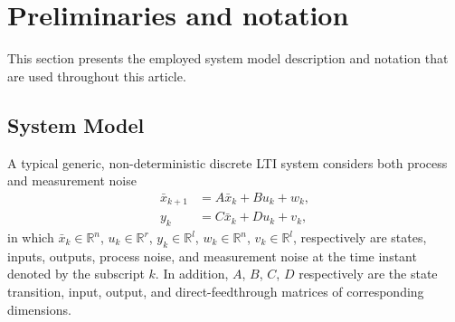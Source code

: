 \section{Preliminaries and notation}
This section presents the employed system model description and notation that are used throughout this article.

\subsection{System Model}
A typical generic, non-deterministic discrete \ac{LTI} system considers both process and measurement noise
\begin{subequations}\label{eqn:SS_wv}
\begin{align}
	\bar{x}_{k+1} &= A\bar{x}_k + Bu_k + w_k,\label{eqn:SSwv_x}\\
	y_k &= C\bar{x}_k + Du_k + v_k \label{eqn:SSwv_y},
\end{align}
\end{subequations}
in which ${\bar{x}_k\in\mathbb{R}^n}$, ${u_k\in\mathbb{R}^r}$, ${y_k\in\mathbb{R}^l}$, ${w_k\in\mathbb{R}^n}$, ${v_k\in\mathbb{R}^l}$, respectively are states, inputs, outputs, process noise, and measurement noise at the time instant denoted by the subscript $k$. In addition, $A$, $B$, $C$, $D$ respectively are the state transition, input, output, and direct-feedthrough matrices of corresponding dimensions.

